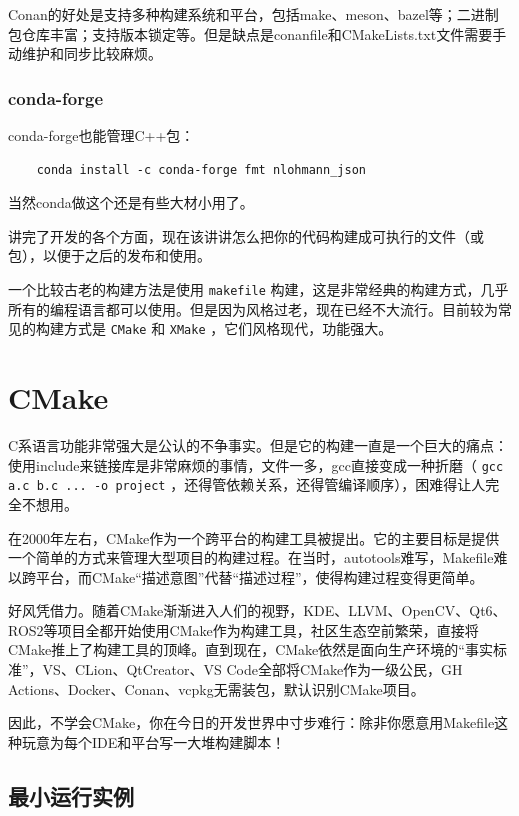 Conan的好处是支持多种构建系统和平台，包括make、meson、bazel等；二进制包仓库丰富；支持版本锁定等。但是缺点是conanfile和CMakeLists.txt文件需要手动维护和同步比较麻烦。

\subsubsection{conda-forge}

conda-forge也能管理C++包：
\begin{verbatim}
    conda install -c conda-forge fmt nlohmann_json
\end{verbatim}
当然conda做这个还是有些大材小用了。

讲完了开发的各个方面，现在该讲讲怎么把你的代码构建成可执行的文件（或包），以便于之后的发布和使用。

一个比较古老的构建方法是使用 \texttt{makefile} 构建，这是非常经典的构建方式，几乎所有的编程语言都可以使用。但是因为风格过老，现在已经不大流行。目前较为常见的构建方式是 \texttt{CMake} 和 \texttt{XMake} ，它们风格现代，功能强大。

\section{CMake}\label{sec:cmake}

C系语言功能非常强大是公认的不争事实。但是它的构建一直是一个巨大的痛点：使用include来链接库是非常麻烦的事情，文件一多，gcc直接变成一种折磨（ \texttt{gcc a.c b.c ... -o project} ，还得管依赖关系，还得管编译顺序），困难得让人完全不想用。

在2000年左右，CMake作为一个跨平台的构建工具被提出。它的主要目标是提供一个简单的方式来管理大型项目的构建过程。在当时，autotools难写，Makefile难以跨平台，而CMake“描述意图”代替“描述过程”，使得构建过程变得更简单。

好风凭借力。随着CMake渐渐进入人们的视野，KDE、LLVM、OpenCV、Qt6、ROS2等项目全都开始使用CMake作为构建工具，社区生态空前繁荣，直接将CMake推上了构建工具的顶峰。直到现在，CMake依然是面向生产环境的“事实标准”，VS、CLion、QtCreator、VS Code全部将CMake作为一级公民，GH Actions、Docker、Conan、vcpkg无需装包，默认识别CMake项目。

因此，不学会CMake，你在今日的开发世界中寸步难行：除非你愿意用Makefile这种玩意为每个IDE和平台写一大堆构建脚本！

\subsection{最小运行实例}

